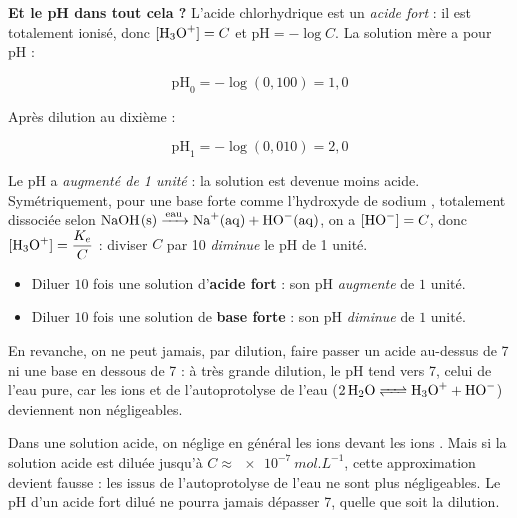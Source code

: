 \documentclass[11pt]{article}
\begin{document}
\textbf{Et le pH dans tout cela ?} L'acide chlorhydrique est un \emph{acide fort} : il est totalement ionisé, donc $[\ce{H3O+}] = C$ et $\mathrm{pH} = -\log C$. La solution mère a pour pH :

\[ \mathrm{pH}_0 = -\log(0{,}100) = 1{,}0 \]

Après dilution au dixième :

\[ \mathrm{pH}_1 = -\log(0{,}010) = 2{,}0 \]

Le pH a \emph{augmenté de 1 unité} : la solution est devenue moins acide. Symétriquement, pour une base forte comme l'hydroxyde de sodium , totalement dissociée selon $\ce{NaOH(s) ->[eau] Na+(aq) + HO-(aq)}$, on a $[\ce{HO-}] = C$, donc $[\ce{H3O+}] = \dfrac{K_e}{C}$ : diviser $C$ par 10 \emph{diminue} le pH de 1 unité.

\begin{propriete}
\begin{itemize}
\item Diluer $10$ fois une solution d'\textbf{acide fort} : son pH \emph{augmente} de $1$ unité.
\item Diluer $10$ fois une solution de \textbf{base forte} : son pH \emph{diminue} de $1$ unité.
\end{itemize}
En revanche, on ne peut jamais, par dilution, faire passer un acide au-dessus de 7 ni une base en dessous de 7 : à très grande dilution, le pH tend vers 7, celui de l'eau pure, car les ions  et  de l'autoprotolyse de l'eau ($\ce{2 H2O <=> H3O+ + HO-}$) deviennent non négligeables.
\end{propriete}

\begin{attention}
Dans une solution acide, on néglige en général les ions  devant les ions . Mais si la solution acide est diluée jusqu'à $C \approx \SI{e-7}{mol.L^{-1}}$, cette approximation devient fausse : les  issus de l'autoprotolyse de l'eau ne sont plus négligeables. Le pH d'un acide fort dilué ne pourra jamais dépasser 7, quelle que soit la dilution.
\end{attention}
\end{document}
